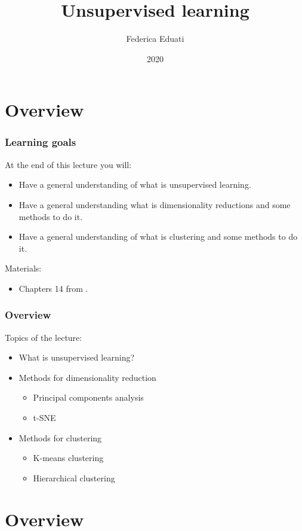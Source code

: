 \documentclass[notes]{beamer}          %
\title{Unsupervised learning}
\author{Federica Eduati}
\institute{Eindhoven University of Technology

Department of Biomedical Engineering}
\date{2020}
\begin{document}
 
\frame{\titlepage}
 
\section{Overview}

\begin{frame}
\frametitle{Learning goals}
At the end of this lecture you will:
\begin{itemize}
    \item Have a general understanding of what is unsupervised learning.
    \item Have a general understanding what is dimensionality reductions and some methods to do it.
    \item Have a general understanding of what is clustering and some methods to do it.
\end{itemize}

\vspace{5mm} 

Materials: 
\begin{itemize}
    \item Chapters 14 from \cite{elements}.
\end{itemize}

\end{frame}

\begin{frame}
\frametitle{Overview}
Topics of the lecture:
\begin{itemize}
    \item What is unsupervised learning?
    \item Methods for dimensionality reduction
    \begin{itemize}
    		\item Principal components analysis
    		\item t-SNE
    \end{itemize}
    \item Methods for clustering
    \begin{itemize}
    		\item K-means clustering
    		\item Hierarchical clustering
    	\end{itemize}
\end{itemize}

\vspace{5mm} 


\end{frame}

\section{Overview}
\end{document}
